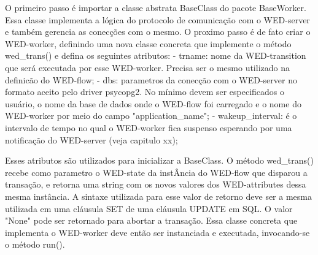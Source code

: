   O primeiro passo é importar a classe abstrata BaseClass do pacote BaseWorker. Essa classe implementa a lógica do protocolo
de comunicação com o WED-server e também gerencia as conecções com o mesmo. 
  O proximo passo é de fato criar o WED-worker, definindo uma nova classe concreta que implemente o método wed_trans() e
defina os seguintes atributos:
  - trname: nome da WED-transition que será executada por esse WED-worker. Precisa ser o mesmo utilizado na definicão
           do WED-flow;
  - dbs: parametros da conecção com o WED-server no formato aceito pelo driver psycopg2. No mínimo devem ser especificados
        o usuário, o nome da base de dados onde o WED-flow foi carregado e o nome do WED-worker por meio do campo "application_name";
  - wakeup_interval: é o intervalo de tempo no qual o WED-worker fica suspenso esperando por uma notificação do WED-server (veja capitulo xx);
  
  Esses atributos são utilizados para inicializar a BaseClass.
  O método wed_trans() recebe como parametro o WED-state da instÂncia do WED-flow que disparou a transação, e retorna uma 
string com os novos valores dos WED-attributes dessa mesma instância. A sintaxe utilizada para esse valor de retorno deve
ser a mesma utilizada em uma cláusula SET de uma cláusula UPDATE em SQL. O valor "None" pode ser retornado para abortar
a transação.
  Essa classe concreta que implementa o WED-worker deve então ser instanciada e executada, invocando-se o método run().


